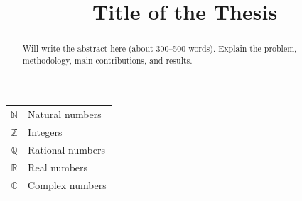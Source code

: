 \documentclass{fmetfm}
\title{Title of the Thesis}
\begin{document}
\maketitle


\begin{preface}
\end{preface}

\frontmatter

\begin{abstract}

\vspace{1cm}
Will write the abstract here (about 300–500 words). Explain the problem,
methodology, main contributions, and results.
\end{abstract}

\begin{notation}
\begin{tabular}{cl}
$\mathbb{N}$ & Natural numbers\\[0.3em]
$\mathbb{Z}$ & Integers\\[0.3em]
$\mathbb{Q}$ & Rational numbers\\[0.3em]
$\mathbb{R}$ & Real numbers\\[0.3em]
$\mathbb{C}$ & Complex numbers
\end{tabular}
\end{notation}

\tableofcontents
\end{document}
